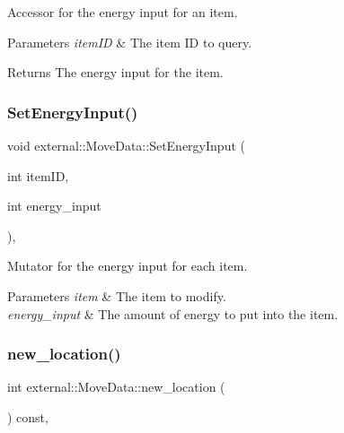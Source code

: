 Accessor for the energy input for an item. 


\begin{DoxyParams}{Parameters}
{\em item\+ID} & The item ID to query. \\
\hline
\end{DoxyParams}
\begin{DoxyReturn}{Returns}
The energy input for the item. 
\end{DoxyReturn}
\mbox{\label{classexternal_1_1_move_data_a9e15f73abac9be9eeeb4e8f702af05f8}} 
\subsubsection{\texorpdfstring{Set\+Energy\+Input()}{SetEnergyInput()}}
{\footnotesize\ttfamily void external\+::\+Move\+Data\+::\+Set\+Energy\+Input (\begin{DoxyParamCaption}\item[{int}]{item\+ID,  }\item[{int}]{energy\+\_\+input }\end{DoxyParamCaption})\hspace{0.3cm}{\ttfamily [inline]}, {\ttfamily [noexcept]}}



Mutator for the energy input for each item. 


\begin{DoxyParams}{Parameters}
{\em item} & The item to modify. \\
\hline
{\em energy\+\_\+input} & The amount of energy to put into the item. \\
\hline
\end{DoxyParams}
\mbox{\label{classexternal_1_1_move_data_a2469eb5c4a210b6ebd769254f190ad7e}} 
\subsubsection{\texorpdfstring{new\+\_\+location()}{new\_location()}}
{\footnotesize\ttfamily int external\+::\+Move\+Data\+::new\+\_\+location (\begin{DoxyParamCaption}{ }\end{DoxyParamCaption}) const\hspace{0.3cm}{\ttfamily [inline]}, {\ttfamily [noexcept]}}



